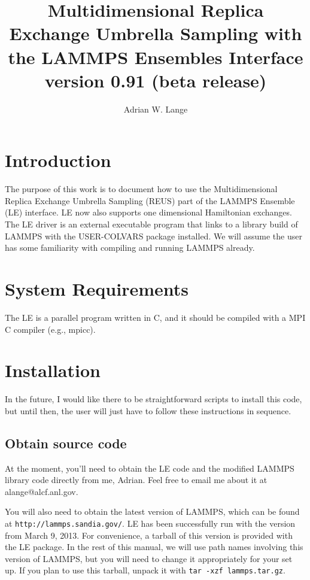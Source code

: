 \documentclass[10pt]{article}
\title{Multidimensional Replica Exchange Umbrella Sampling with the LAMMPS Ensembles Interface\\
\large version 0.91 (beta release)
}
\author{Adrian W. Lange}
\begin{document}
\maketitle

\section{Introduction}

The purpose of this work is to document how to use the Multidimensional Replica Exchange Umbrella
Sampling (REUS) part of the LAMMPS Ensemble (LE) interface. LE now also supports
one dimensional Hamiltonian exchanges. The LE driver
is an external executable program that links to a library build of LAMMPS with the 
USER-COLVARS package installed. We will assume the user has some familiarity with
compiling and running LAMMPS already. 

\section{System Requirements}

The LE is a parallel program written in C, and it should be compiled
with a MPI C compiler (e.g., mpicc). 

\section{Installation}

In the future, I would like there to be straightforward scripts to install this code,
but until then, the user will just have to follow these instructions in sequence.

\subsection{Obtain source code}

At the moment, you'll need to obtain the LE code and the modified LAMMPS
library code directly from me, Adrian. Feel free to email me about it at alange@alcf.anl.gov. 

You will also need to obtain the latest version of LAMMPS, which can be found at
\texttt{http://lammps.sandia.gov/}. LE has been successfully run with the version from
March 9, 2013. For convenience, a tarball of this version is provided with the LE package.
In the rest of this manual, we will use path names involving this version of LAMMPS, but
you will need to change it appropriately for your set up. If you plan to use this tarball,
unpack it with \texttt{tar -xzf lammps.tar.gz}.
\end{document}
